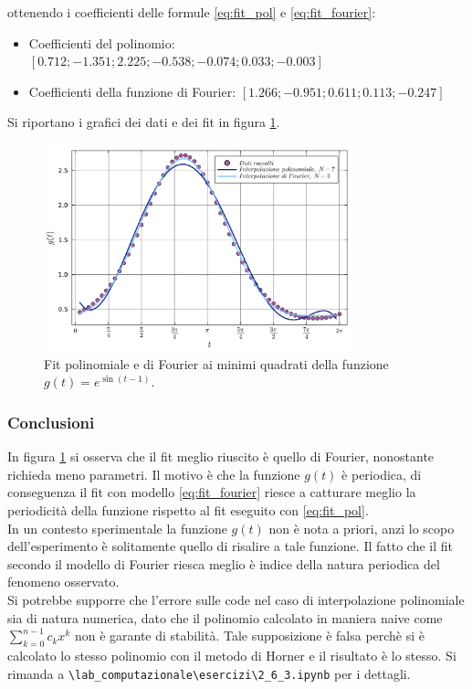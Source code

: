 \documentclass[letterpaper, 12pt]{article}
\numberwithin{equation}{section}    %
\begin{document}
ottenendo i coefficienti delle formule \ref{eq:fit_pol} e \ref{eq:fit_fourier}:
\begin{itemize}
    \item Coefficienti del polinomio: $[0.712; -1.351; 2.225; -0.538; -0.074; 0.033; -0.003]$
    \item Coefficienti della funzione di Fourier: $[1.266; -0.951; 0.611; 0.113; -0.247]$
\end{itemize}

Si riportano i grafici dei dati e dei fit in figura \ref{fig:es2_6_3_1}.
\begin{figure}[!ht]
    \centering
    \includegraphics[width=0.8\textwidth]{2631.pdf}
    \caption{Fit polinomiale e di Fourier ai minimi quadrati della funzione $g(t)=e^{\sin(t-1)}$.}
    \label{fig:es2_6_3_1}
\end{figure}

\subsubsection{Conclusioni}
In figura \ref{fig:es2_6_3_1} si osserva che il fit meglio riuscito è quello di Fourier, nonostante
richieda meno parametri. Il motivo è che la funzione $g(t)$ è periodica, di conseguenza il fit con modello 
\ref{eq:fit_fourier} riesce a catturare meglio la periodicità della funzione rispetto al fit eseguito con 
\ref{eq:fit_pol}. \\
In un contesto sperimentale la funzione $g(t)$ non è nota a priori, anzi lo scopo dell'esperimento è 
solitamente quello di risalire a tale funzione. Il fatto che il fit secondo il modello di Fourier riesca meglio
è indice della natura periodica del fenomeno osservato. \\
Si potrebbe supporre che l'errore sulle code nel caso di interpolazione polinomiale sia di natura numerica, 
dato che il polinomio calcolato in maniera naive come $\sum_{k=0}^{n-1} c_k x^k$ non è garante di stabilità.
Tale supposizione è falsa perchè si è calcolato lo stesso polinomio con il metodo di Horner e il risultato 
è lo stesso. Si rimanda a \verb|\lab_computazionale\esercizi\2_6_3.ipynb| per i dettagli. \\
\end{document}
